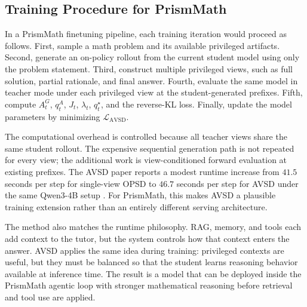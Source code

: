 \subsection{Training Procedure for PrismMath}

In a PrismMath finetuning pipeline, each training iteration would proceed as follows. First, sample a math problem and its available privileged artifacts. Second, generate an on-policy rollout from the current student model using only the problem statement. Third, construct multiple privileged views, such as full solution, partial rationale, and final answer. Fourth, evaluate the same model in teacher mode under each privileged view at the student-generated prefixes. Fifth, compute $A_t^G$, $q_t^A$, $J_t$, $\lambda_t$, $q_t^{\star}$, and the reverse-KL loss. Finally, update the model parameters by minimizing $\mathcal{L}_{\mathrm{AVSD}}$.

The computational overhead is controlled because all teacher views share the same student rollout. The expensive sequential generation path is not repeated for every view; the additional work is view-conditioned forward evaluation at existing prefixes. The AVSD paper reports a modest runtime increase from $41.5$ seconds per step for single-view OPSD to $46.7$ seconds per step for AVSD under the same Qwen3-4B setup \citep{nguyen2026avsd}. For PrismMath, this makes AVSD a plausible training extension rather than an entirely different serving architecture.

The method also matches the runtime philosophy. RAG, memory, and tools each add context to the tutor, but the system controls how that context enters the answer. AVSD applies the same idea during training: privileged contexts are useful, but they must be balanced so that the student learns reasoning behavior available at inference time. The result is a model that can be deployed inside the PrismMath agentic loop with stronger mathematical reasoning before retrieval and tool use are applied.
